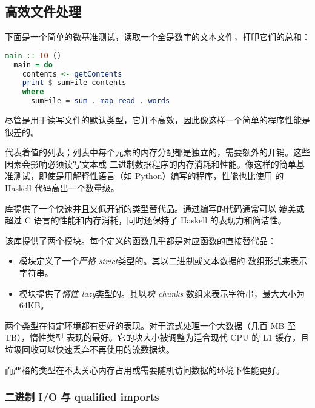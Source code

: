 \documentclass[./main.tex]{subfiles}
\begin{document}
\subsection*{高效文件处理}

下面是一个简单的微基准测试，读取一个全是数字的文本文件，打印它们的总和：

\begin{lstlisting}[language=Haskell]
  main :: IO ()
  main = do
    contents <- getContents
    print $ sumFile contents
    where
      sumFile = sum . map read . words
\end{lstlisting}

尽管是用于读写文件的默认类型，它并不高效，因此像这样一个简单的程序性能是很差的。

代表着值的列表；列表中每个元素的内存分配都是独立的，需要额外的开销。这些因素会影响必须读写文本或
二进制数据程序的内存消耗和性能。像这样的简单基准测试，即使是用解释性语言（如 Python）编写的程序，性能也比使用
的 Haskell 代码高出一个数量级。

库提供了一个快速并且又低开销的类型替代品。通过编写的代码通常可以
媲美或超过 C 语言的性能和内存消耗，同时还保持了 Haskell 的表现力和简洁性。

该库提供了两个模块。每个定义的函数几乎都是对应函数的直接替代品：

\begin{itemize}
  \item {}模块定义了一个\textit{严格 strict}类型的。其以二进制或文本数据的
        数组形式来表示字符串。
  \item {}模块提供了\textit{惰性 lazy}类型的。其以\textit{块 chunks}
        数组来表示字符串，最大大小为 64KB。
\end{itemize}

两个类型在特定环境都有更好的表现。对于流式处理一个大数据（几百 MB 至 TB），惰性类型
表现的最好。它的块大小被调整为适合现代 CPU 的 L1 缓存，且垃圾回收可以快速丢弃不再使用的流数据块。

而严格的类型在不太关心内存占用或需要随机访问数据的环境下性能更好。

\subsubsection*{二进制 I/O 与 qualified imports}
\end{document}
